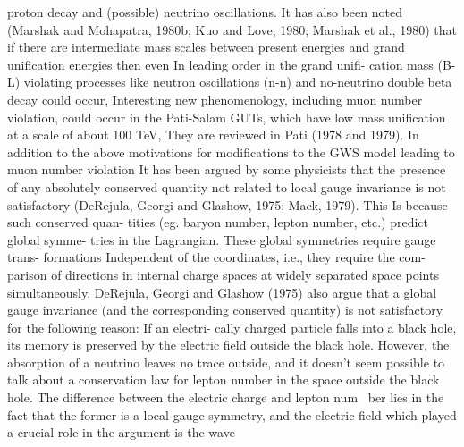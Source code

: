 \documentclass[twoside]{article}
\begin{document}
{{{proton decay and (possible) neutrino oscillations. It has also been noted
(Marshak and Mohapatra, 1980b; Kuo and Love, 1980; Marshak et al., 1980)
that if there are intermediate mass scales between present energies and
grand unification energies then even In leading order in the grand unifi-
cation mass (B-L) violating processes like neutron oscillations (n-n) and
no-neutrino double beta decay could occur, Interesting new phenomenology,
including muon number violation, could occur in the Pati-Salam GUTs,
which have low mass unification at a scale of about 100 TeV, They are
reviewed in Pati (1978 and 1979).
In addition to the above motivations for modifications to the GWS
model leading to muon number violation It has been argued by some
physicists that the presence of any absolutely conserved quantity not
related to local gauge invariance is not satisfactory (DeRejula, Georgi
and Glashow, 1975; Mack, 1979). This Is because such conserved quan-
tities (eg. baryon number, lepton number, etc.) predict global symme-
tries in the Lagrangian. These global symmetries require gauge trans-
formations Independent of the coordinates, i.e., they require the com-
parison of directions in internal charge spaces at widely separated
space points simultaneously. DeRejula, Georgi and Glashow (1975) also
argue that a global gauge invariance (and the corresponding conserved
quantity) is not satisfactory for the following reason: If an electri-
cally charged particle falls into a black hole, its memory is preserved
by the electric field outside the black hole. However, the absorption
of a neutrino leaves no trace outside, and it doesn't seem possible to
talk about a conservation law for lepton number in the space outside the
black hole. The difference between the electric charge and lepton num~
ber lies in the fact that the former is a local gauge symmetry, and the
electric field which played a crucial role in the argument is the wave

}}}
\end{document}
